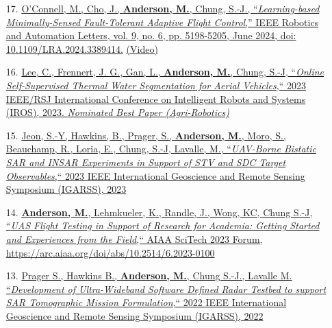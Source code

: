 \documentclass[12pt,letter,sans]{moderncv}
\begin{document}
\begin{itemize}
    \item [17.] \href{https://ieeexplore.ieee.org/document/10502204}
    {O’Connell, M., Cho, J., \underline{\textbf{Anderson, M.}}, Chung, S.-J., ``\textit{Learning-based Minimally-Sensed Fault-Tolerant Adaptive Flight Control},'' IEEE Robotics and Automation Letters, vol. 9, no. 6, pp. 5198-5205, June 2024, doi: 10.1109/LRA.2024.3389414.}
    \href{https://www.youtube.com/watch?v=IzFFEcvQiXw}{(Video)}
    
	\item[16.] \href{https://ieeexplore.ieee.org/document/10342016}
	{Lee, C., Frennert, J. G., Gan, L., \underline{\textbf{Anderson, M.}}, Chung, S.-J, ``\textit{Online Self-Supervised Thermal Water Segmentation for Aerial Vehicles},`` 2023 IEEE/RSJ International Conference on Intelligent Robots and Systems (IROS), 2023. \textit{Nominated Best Paper (Agri-Robotics)}}
	
	\item[15.] \href{https://ieeexplore.ieee.org/document/10282077}
	{Jeon, S.-Y, Hawkins, B., Prager, S., \underline{\textbf{Anderson, M.}}, Moro, S., Beauchamp, R., Loria, E., Chung, S.-J, Lavalle, M., ``\textit{UAV-Borne Bistatic SAR and INSAR Experiments in Support of STV and SDC Target Observables},`` 2023 IEEE International Geoscience and Remote Sensing Symposium (IGARSS), 2023}
	    
    \item [14.] \href{https://arc.aiaa.org/doi/10.2514/6.2023-0100}
    { \underline{\textbf{Anderson, M.}}, Lehmkueler, K., Randle, J., Wong, KC, Chung S.-J, ``\textit{UAS Flight Testing in Support of Research for Academia: Getting Started and Experiences from the Field},`` AIAA SciTech 2023 Forum, \url{https://arc.aiaa.org/doi/abs/10.2514/6.2023-0100}}
    
    \item [13.] \href{https://ieeexplore.ieee.org/document/9883873}
    {Prager S., Hawkins B., \underline{\textbf{Anderson, M.}}, Chung S.-J., Lavalle M. ``\textit{Development of Ultra-Wideband Software Defined Radar Testbed to support SAR Tomographic Mission Formulation},`` 2022 IEEE International Geoscience and Remote Sensing Symposium (IGARSS), 2022}
    

\end{itemize}
\end{document}
